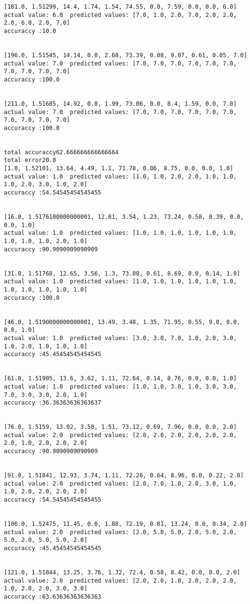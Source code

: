 \documentclass[11pt]{article}
\begin{document}
\begin{Verbatim}[commandchars=\\\{\}]
[181.0, 1.51299, 14.4, 1.74, 1.54, 74.55, 0.0, 7.59, 0.0, 0.0, 6.0]
actual value: 6.0  predicted values: [7.0, 1.0, 2.0, 7.0, 2.0, 2.0, 2.0, 6.0, 2.0, 7.0]
accuraccy :10.0


[196.0, 1.51545, 14.14, 0.0, 2.68, 73.39, 0.08, 9.07, 0.61, 0.05, 7.0]
actual value: 7.0  predicted values: [7.0, 7.0, 7.0, 7.0, 7.0, 7.0, 7.0, 7.0, 7.0, 7.0]
accuraccy :100.0


[211.0, 1.51685, 14.92, 0.0, 1.99, 73.06, 0.0, 8.4, 1.59, 0.0, 7.0]
actual value: 7.0  predicted values: [7.0, 7.0, 7.0, 7.0, 7.0, 7.0, 7.0, 7.0, 7.0, 7.0]
accuraccy :100.0


total accuraccy62.666666666666664
total error20.0
[1.0, 1.52101, 13.64, 4.49, 1.1, 71.78, 0.06, 8.75, 0.0, 0.0, 1.0]
actual value: 1.0  predicted values: [1.0, 1.0, 2.0, 2.0, 1.0, 1.0, 1.0, 2.0, 3.0, 1.0, 2.0]
accuraccy :54.54545454545455


[16.0, 1.5176100000000001, 12.81, 3.54, 1.23, 73.24, 0.58, 8.39, 0.0, 0.0, 1.0]
actual value: 1.0  predicted values: [1.0, 1.0, 1.0, 1.0, 1.0, 1.0, 1.0, 1.0, 1.0, 2.0, 1.0]
accuraccy :90.9090909090909


[31.0, 1.51768, 12.65, 3.56, 1.3, 73.08, 0.61, 8.69, 0.0, 0.14, 1.0]
actual value: 1.0  predicted values: [1.0, 1.0, 1.0, 1.0, 1.0, 1.0, 1.0, 1.0, 1.0, 1.0, 1.0]
accuraccy :100.0


[46.0, 1.5190000000000001, 13.49, 3.48, 1.35, 71.95, 0.55, 9.0, 0.0, 0.0, 1.0]
actual value: 1.0  predicted values: [3.0, 3.0, 7.0, 1.0, 2.0, 3.0, 1.0, 2.0, 1.0, 1.0, 1.0]
accuraccy :45.45454545454545


[61.0, 1.51905, 13.6, 3.62, 1.11, 72.64, 0.14, 8.76, 0.0, 0.0, 1.0]
actual value: 1.0  predicted values: [1.0, 1.0, 3.0, 1.0, 3.0, 3.0, 7.0, 3.0, 3.0, 2.0, 1.0]
accuraccy :36.36363636363637


[76.0, 1.5159, 13.02, 3.58, 1.51, 73.12, 0.69, 7.96, 0.0, 0.0, 2.0]
actual value: 2.0  predicted values: [2.0, 2.0, 2.0, 2.0, 2.0, 2.0, 2.0, 1.0, 2.0, 2.0, 2.0]
accuraccy :90.9090909090909


[91.0, 1.51841, 12.93, 3.74, 1.11, 72.28, 0.64, 8.96, 0.0, 0.22, 2.0]
actual value: 2.0  predicted values: [2.0, 7.0, 1.0, 2.0, 3.0, 1.0, 1.0, 2.0, 2.0, 2.0, 2.0]
accuraccy :54.54545454545455


[106.0, 1.52475, 11.45, 0.0, 1.88, 72.19, 0.81, 13.24, 0.0, 0.34, 2.0]
actual value: 2.0  predicted values: [2.0, 5.0, 5.0, 2.0, 5.0, 2.0, 5.0, 2.0, 5.0, 5.0, 2.0]
accuraccy :45.45454545454545


[121.0, 1.51844, 13.25, 3.76, 1.32, 72.4, 0.58, 8.42, 0.0, 0.0, 2.0]
actual value: 2.0  predicted values: [2.0, 2.0, 1.0, 2.0, 2.0, 2.0, 1.0, 2.0, 2.0, 3.0, 3.0]
accuraccy :63.63636363636363



\end{Verbatim}
\end{document}
